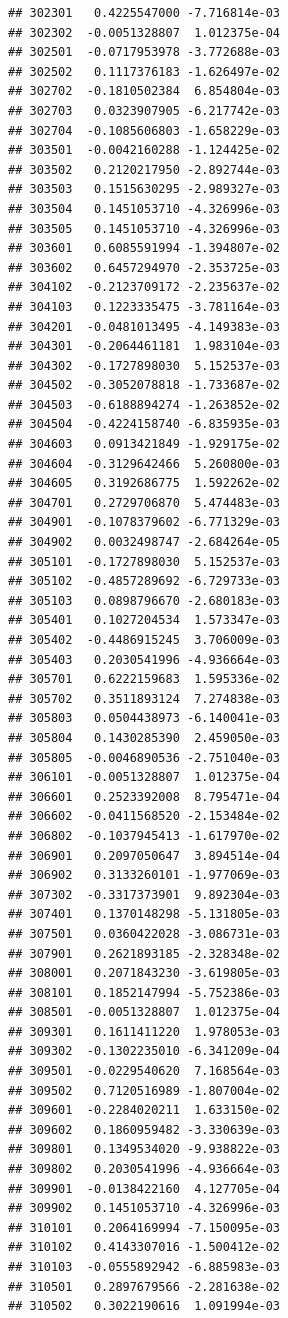 \documentclass[ignorenonframetext,]{beamer}
\begin{document}
\begin{frame}[fragile]
\begin{verbatim}
## 302301   0.4225547000 -7.716814e-03
## 302302  -0.0051328807  1.012375e-04
## 302501  -0.0717953978 -3.772688e-03
## 302502   0.1117376183 -1.626497e-02
## 302702  -0.1810502384  6.854804e-03
## 302703   0.0323907905 -6.217742e-03
## 302704  -0.1085606803 -1.658229e-03
## 303501  -0.0042160288 -1.124425e-02
## 303502   0.2120217950 -2.892744e-03
## 303503   0.1515630295 -2.989327e-03
## 303504   0.1451053710 -4.326996e-03
## 303505   0.1451053710 -4.326996e-03
## 303601   0.6085591994 -1.394807e-02
## 303602   0.6457294970 -2.353725e-03
## 304102  -0.2123709172 -2.235637e-02
## 304103   0.1223335475 -3.781164e-03
## 304201  -0.0481013495 -4.149383e-03
## 304301  -0.2064461181  1.983104e-03
## 304302  -0.1727898030  5.152537e-03
## 304502  -0.3052078818 -1.733687e-02
## 304503  -0.6188894274 -1.263852e-02
## 304504  -0.4224158740 -6.835935e-03
## 304603   0.0913421849 -1.929175e-02
## 304604  -0.3129642466  5.260800e-03
## 304605   0.3192686775  1.592262e-02
## 304701   0.2729706870  5.474483e-03
## 304901  -0.1078379602 -6.771329e-03
## 304902   0.0032498747 -2.684264e-05
## 305101  -0.1727898030  5.152537e-03
## 305102  -0.4857289692 -6.729733e-03
## 305103   0.0898796670 -2.680183e-03
## 305401   0.1027204534  1.573347e-03
## 305402  -0.4486915245  3.706009e-03
## 305403   0.2030541996 -4.936664e-03
## 305701   0.6222159683  1.595336e-02
## 305702   0.3511893124  7.274838e-03
## 305803   0.0504438973 -6.140041e-03
## 305804   0.1430285390  2.459050e-03
## 305805  -0.0046890536 -2.751040e-03
## 306101  -0.0051328807  1.012375e-04
## 306601   0.2523392008  8.795471e-04
## 306602  -0.0411568520 -2.153484e-02
## 306802  -0.1037945413 -1.617970e-02
## 306901   0.2097050647  3.894514e-04
## 306902   0.3133260101 -1.977069e-03
## 307302  -0.3317373901  9.892304e-03
## 307401   0.1370148298 -5.131805e-03
## 307501   0.0360422028 -3.086731e-03
## 307901   0.2621893185 -2.328348e-02
## 308001   0.2071843230 -3.619805e-03
## 308101   0.1852147994 -5.752386e-03
## 308501  -0.0051328807  1.012375e-04
## 309301   0.1611411220  1.978053e-03
## 309302  -0.1302235010 -6.341209e-04
## 309501  -0.0229540620  7.168564e-03
## 309502   0.7120516989 -1.807004e-02
## 309601  -0.2284020211  1.633150e-02
## 309602   0.1860959482 -3.330639e-03
## 309801   0.1349534020 -9.938822e-03
## 309802   0.2030541996 -4.936664e-03
## 309901  -0.0138422160  4.127705e-04
## 309902   0.1451053710 -4.326996e-03
## 310101   0.2064169994 -7.150095e-03
## 310102   0.4143307016 -1.500412e-02
## 310103  -0.0555892942 -6.885983e-03
## 310501   0.2897679566 -2.281638e-02
## 310502   0.3022190616  1.091994e-03

\end{verbatim}
\end{frame}
\end{document}
